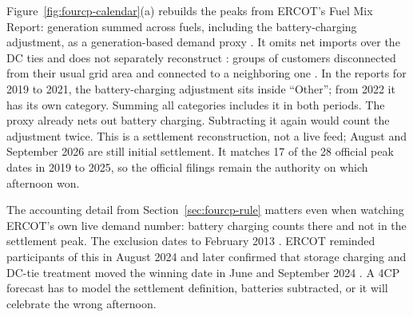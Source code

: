 Figure~\ref{fig:fourcp-calendar}(a) rebuilds the peaks from ERCOT's Fuel Mix Report: generation summed across fuels, including the battery-charging adjustment, as a generation-based demand proxy \autocite{ercotfuelmixhistory}. It omits net imports over the DC ties and does not separately reconstruct : groups of customers disconnected from their usual grid area and connected to a neighboring one \autocite{ercot2026protocols}. In the reports for 2019 to 2021, the battery-charging adjustment sits inside ``Other''; from 2022 it has its own category. Summing all categories includes it in both periods. The proxy already nets out battery charging. Subtracting it again would count the adjustment twice. This is a settlement reconstruction, not a live feed; August and September 2026 are still initial settlement. It matches 17 of the 28 official peak dates in 2019 to 2025, so the official filings remain the authority on which afternoon won. %

The accounting detail from Section~\ref{sec:fourcp-rule} matters even when watching ERCOT's own live demand number: battery charging counts there and not in the settlement peak. The exclusion dates to February 2013 \autocite{ercotnprr461}. ERCOT reminded participants of this in August 2024 and later confirmed that storage charging and DC-tie treatment moved the winning date in June and September 2024 \autocite{ercot2024mktnotice4cp,ercottwg20254cp}. %
A 4CP forecast has to model the settlement definition, batteries subtracted, or it will celebrate the wrong afternoon.

